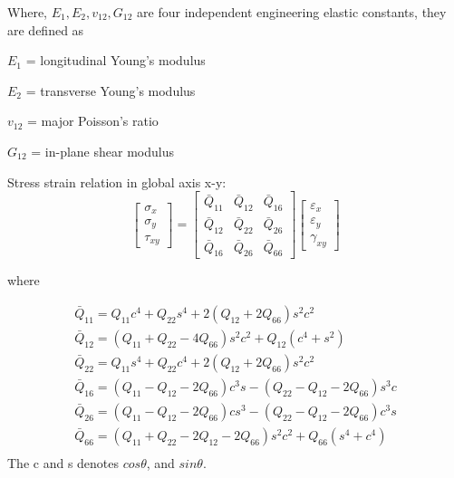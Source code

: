 \documentclass[Afour,sagev,times]{sagej}
\begin{document}
Where, $E_1, E_2, v_{12}, G_{12}$ are four independent engineering elastic constants, they are
defined as 

$E_1$ = longitudinal Young's modulus

$E_2$ = transverse  Young's modulus

$v_{12}$ = major Poisson's ratio

$G_{12}$ = in-plane shear modulus 

Stress strain relation in global axis x-y:  
\begin{equation}
	\left[\begin{array}{l}\sigma_{x} \\ \sigma_{y} \\ \tau_{x
			y}\end{array}\right]=\left[\begin{array}{lll}\bar{Q}_{11} & \bar{Q}_{12} & \bar{Q}_{16}
			\\ \bar{Q}_{12} & \bar{Q}_{22} & \bar{Q}_{26} \\ \bar{Q}_{16} & \bar{Q}_{26} &
			\bar{Q}_{66}\end{array}\right]\left[\begin{array}{l}\varepsilon_{x} \\ \varepsilon_{y}
	\\ \gamma_{x y}\end{array}\right]
\end{equation}

where

\begin{equation}
	\begin{array}{l}
		\bar{Q}_{11}=Q_{11} c^{4}+Q_{22} s^{4}+2\left(Q_{12}+2 Q_{66}\right) s^{2} c^{2}
		\\ 
		\bar{Q}_{12}=\left(Q_{11}+Q_{22}-4 Q_{66}\right) s^{2} c^{2}+Q_{12}\left(c^{4}+s^{2}\right)
		\\ 
		\bar{Q}_{22}=Q_{11} s^{4}+Q_{22} c^{4}+2\left(Q_{12}+2 Q_{66}\right) s^{2} c^{2} \\

		\bar{Q}_{16}=\left(Q_{11}-Q_{12}-2 Q_{66}\right) c^{3} s-\left(Q_{22}-Q_{12}-2
			Q_{66}\right) s^{3} c \\ 
		\bar{Q}_{26}=\left(Q_{11}-Q_{12}-2 Q_{66}\right) c s^{3}-\left(Q_{22}-Q_{12}-2 Q_{66}\right)
		c^{3} s \\ 
		\bar{Q}_{66}=\left(Q_{11}+Q_{22}-2 Q_{12}-2 Q_{66}\right) s^{2}
		c^{2}+Q_{66}\left(s^{4}+c^{4}\right)\\
	\end{array}
\end{equation}
The c and s denotes $cos\theta$, and $sin\theta$. 
\end{document}
